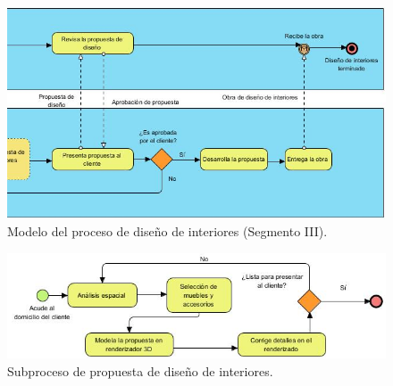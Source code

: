 \begin{figure}[!htbp]
	\centering
	\includegraphics[width=18cm,angle=270,origin=c]{imagenes/marcoteorico/bpmn/proceso_03_01.jpg}
	\caption{Modelo del proceso de diseño de interiores (Segmento III).}
	\label{fig:bpmn_antes}
\end{figure}
\newpage

\begin{figure}[!htbp]
	\centering
	\includegraphics[width=16cm]{imagenes/marcoteorico/bpmn/subproceso.jpg}
	\caption{Subproceso de propuesta de diseño de interiores.}
	\label{fig:subproceso}
\end{figure}
\newpage